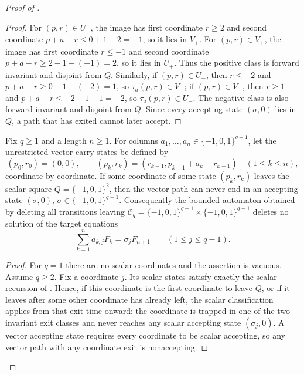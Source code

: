 \begin{proof}[Proof of ]
\begin{proof}
For \((p,r)\in U_+\), the image has first coordinate \(r\ge2\) and second
coordinate \(p+a-r\le 0+1-2=-1\), so it lies in \(V_+\).  For
\((p,r)\in V_+\), the image has first coordinate \(r\le-1\) and second coordinate
\(p+a-r\ge2-1-(-1)=2\), so it lies in \(U_+\).  Thus the positive class is
forward invariant and disjoint from \(Q\).  Similarly, if \((p,r)\in U_-\), then
\(r\le-2\) and \(p+a-r\ge0-1-(-2)=1\), so \(\tau_a(p,r)\in V_-\); if
\((p,r)\in V_-\), then \(r\ge1\) and \(p+a-r\le-2+1-1=-2\), so
\(\tau_a(p,r)\in U_-\).  The negative class is also forward invariant and
disjoint from \(Q\).  Since every accepting state \((\sigma,0)\) lies in \(Q\), a
path that has exited cannot later accept.
\end{proof}

\begin{lemma}
\label{lem:coordinatewise-signed-fibonacci-exit-deletion}
Fix \(q\ge1\) and a length \(n\ge1\).  For columns
\(a_1,\ldots,a_n\in\{-1,0,1\}^{q-1}\), let the unrestricted vector carry states be
defined by
\[
  (p_0,r_0)=(0,0),
  \qquad (p_k,r_k)=(r_{k-1},p_{k-1}+a_k-r_{k-1})
  \quad(1\le k\le n),
\]
coordinate by coordinate.  If some coordinate of some state \((p_k,r_k)\) leaves
the scalar square \(Q=\{-1,0,1\}^2\), then the vector path can never end in an
accepting state \((\sigma,0)\), \(\sigma\in\{-1,0,1\}^{q-1}\).  Consequently the
bounded automaton obtained by deleting all transitions leaving
\(\mathcal C_q=\{-1,0,1\}^{q-1}\times\{-1,0,1\}^{q-1}\) deletes no solution of the
target equations
\[
  \sum_{k=1}^n a_{k,j}F_k=\sigma_jF_{n+1}
  \qquad(1\le j\le q-1).
\]
\end{lemma}

\begin{proof}
For \(q=1\) there are no scalar coordinates and the assertion is vacuous.  Assume
\(q\ge2\).  Fix a coordinate \(j\).  Its scalar states satisfy exactly the scalar
recursion of .  Hence, if
this coordinate is the first coordinate to leave \(Q\), or if it leaves after
some other coordinate has already left, the scalar classification applies from
that exit time onward: the coordinate is trapped in one of the two invariant exit
classes and never reaches any scalar accepting state \((\sigma_j,0)\).  A vector
accepting state requires every coordinate to be scalar accepting, so any vector
path with any coordinate exit is nonaccepting.


\end{proof}
\end{proof}
